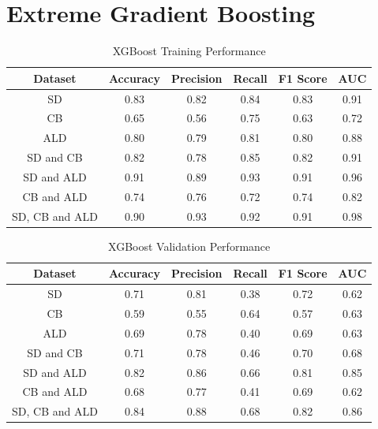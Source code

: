 \vspace{10pt}




\section{Extreme Gradient Boosting}

\vspace{10pt}

\begin{table}[H]
\begin{center}
\begin{tabular}{|c|c|c|c|c|c|} 
\hline
\multicolumn{1}{|c|}{Dataset}
&\multicolumn{1}{|c|}{Accuracy}
&\multicolumn{1}{|c|}{Precision}
&\multicolumn{1}{|c|}{Recall}
&\multicolumn{1}{|c|}{F1 Score}
&\multicolumn{1}{|c|}{AUC}\\
\hline
SD & 0.83 & 0.82 & 0.84 & 0.83 & 0.91    \\
\hline
CB & 0.65 & 0.56 & 0.75 & 0.63 & 0.72    \\
\hline
ALD & 0.80 & 0.79 & 0.81 & 0.80 & 0.88    \\
\hline
SD and CB & 0.82 & 0.78 & 0.85 & 0.82 & 0.91    \\
\hline
SD and ALD & 0.91 & 0.89 & 0.93 & 0.91 & 0.96    \\
\hline
CB and ALD & 0.74 & 0.76 & 0.72 & 0.74 & 0.82    \\
\hline
SD, CB and ALD & 0.90 & 0.93 & 0.92 & 0.91 & 0.98    \\
\hline
\end{tabular}
\end{center}
\caption{XGBoost Training Performance}
\label{table:xgb training}
\end{table}

\vspace{10pt}

\begin{table}[H]
\begin{center}
\begin{tabular}{|c|c|c|c|c|c|} 
\hline
\multicolumn{1}{|c|}{Dataset}
&\multicolumn{1}{|c|}{Accuracy}
&\multicolumn{1}{|c|}{Precision}
&\multicolumn{1}{|c|}{Recall}
&\multicolumn{1}{|c|}{F1 Score}
&\multicolumn{1}{|c|}{AUC}\\
\hline
SD & 0.71 & 0.81 & 0.38 & 0.72 & 0.62    \\
\hline
CB & 0.59 & 0.55 & 0.64 & 0.57 & 0.63    \\
\hline
ALD & 0.69 & 0.78 & 0.40 & 0.69 & 0.63    \\
\hline
SD and CB & 0.71 & 0.78 & 0.46 & 0.70 & 0.68    \\
\hline
SD and ALD & 0.82 & 0.86 & 0.66 & 0.81 & 0.85    \\
\hline
CB and ALD & 0.68 & 0.77 & 0.41 & 0.69 & 0.62    \\
\hline
SD, CB and ALD & 0.84 & 0.88 & 0.68 & 0.82 & 0.86    \\
\hline
\end{tabular}
\end{center}
\caption{XGBoost Validation Performance}
\label{table:xgb test}
\end{table}


